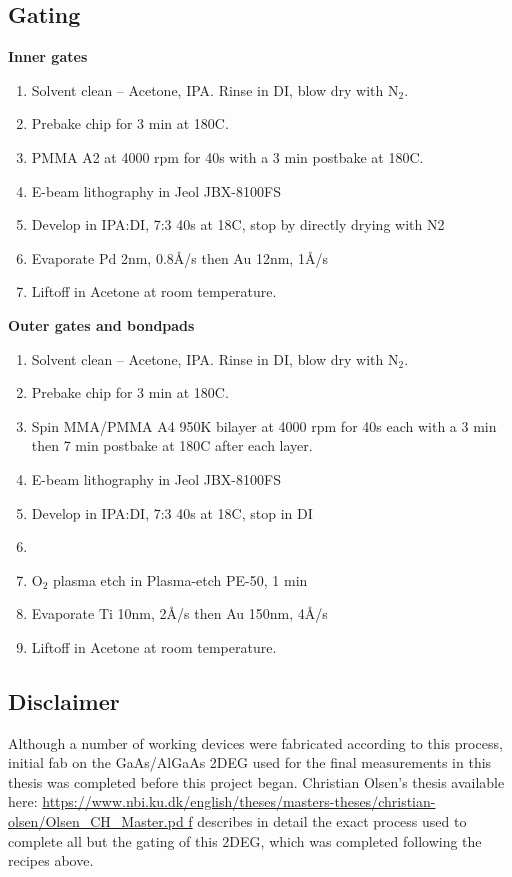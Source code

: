 \subsection{Gating}
\textbf{Inner gates}
\begin{enumerate}
	\item Solvent clean -- Acetone, IPA. Rinse in DI, blow dry with N$_2$.
	\item Prebake chip for 3 min at 180C.
    \item PMMA A2 at 4000 rpm for 40s with a 3 min postbake at 180C.
    \item E-beam lithography in Jeol JBX-8100FS
    \item Develop in IPA:DI, 7:3 40s at 18C, stop by directly drying with N2
    \item Evaporate Pd 2nm, 0.8\r{A}/s then Au 12nm, 1\r{A}/s 
    \item Liftoff in Acetone at room temperature.
\end{enumerate}
\textbf{Outer gates and bondpads}
\begin{enumerate}
	\item Solvent clean -- Acetone, IPA. Rinse in DI, blow dry with N$_2$.
	\item Prebake chip for 3 min at 180C.
    \item Spin MMA/PMMA A4 950K bilayer at 4000 rpm for 40s each with a 3 min then 7 min postbake at 180C after each layer.
    \item E-beam lithography in Jeol JBX-8100FS
    \item Develop in IPA:DI, 7:3 40s at 18C, stop in DI
    \item \item O$_2$ plasma etch in Plasma-etch PE-50, 1 min
    \item Evaporate Ti 10nm, 2\r{A}/s then Au 150nm, 4\r{A}/s 
    \item Liftoff in Acetone at room temperature.
\end{enumerate}

\subsection{Disclaimer}
Although a number of working devices were fabricated according to this process, initial fab on the GaAs/AlGaAs \ac{2DEG} used for the final measurements in this thesis was completed before this project began. Christian Olsen's thesis available here: \url{https://www.nbi.ku.dk/english/theses/masters-theses/christian-olsen/Olsen_CH_Master.pd f} describes in detail the exact process used to complete all but the gating of this \ac{2DEG}, which was completed following the recipes above.





